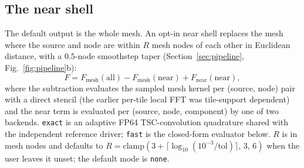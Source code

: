 \subsection{The near shell}
\label{sec:nearsheet}

The default output is the whole mesh. An opt-in near shell replaces the mesh
where the source and node are within $R$ mesh nodes of each other in
Euclidean distance, with a $0.5$-node smoothstep taper
(Section~\ref{sec:pipeline}, Fig.~\ref{fig:pipeline}b):
\begin{equation}
\label{eq:nearshell}
F = F_{\mathrm{mesh}}(\mathrm{all}) - F_{\mathrm{mesh}}(\mathrm{near})
    + F_{\mathrm{near}}(\mathrm{near}),
\end{equation}
where the subtraction evaluates the sampled mesh kernel per (source, node)
pair with a direct stencil (the earlier per-tile local FFT was tile-support
dependent) and the near term is evaluated per (source, node, component) by
one of two backends. \texttt{exact} is an adaptive FP64
TSC-convolution quadrature shared with the independent reference driver;
\texttt{fast} is the closed-form evaluator below. $R$ is in mesh nodes and
defaults to $R=\mathrm{clamp}(3+\lceil\log_{10}(10^{-3}/\mathrm{tol})
\rceil,\,3,\,6)$ when the user leaves it unset; the default mode is
\texttt{none}.

